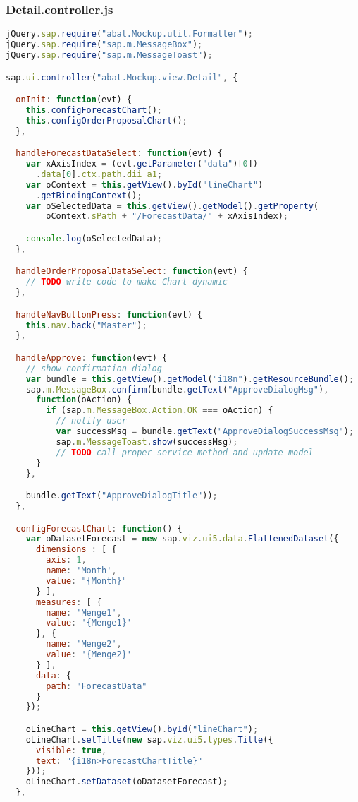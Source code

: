 \subsubsection*{Detail.controller.js}
\begin{lstlisting}[language=JavaScript, label=lst:Detail.controller.js]
jQuery.sap.require("abat.Mockup.util.Formatter");
jQuery.sap.require("sap.m.MessageBox");
jQuery.sap.require("sap.m.MessageToast");

sap.ui.controller("abat.Mockup.view.Detail", {

  onInit: function(evt) {
    this.configForecastChart();
    this.configOrderProposalChart();
  },

  handleForecastDataSelect: function(evt) {
    var xAxisIndex = (evt.getParameter("data")[0])
      .data[0].ctx.path.dii_a1;
    var oContext = this.getView().byId("lineChart")
      .getBindingContext();
    var oSelectedData = this.getView().getModel().getProperty(
        oContext.sPath + "/ForecastData/" + xAxisIndex);

    console.log(oSelectedData);
  },

  handleOrderProposalDataSelect: function(evt) {
    // TODO write code to make Chart dynamic
  },

  handleNavButtonPress: function(evt) {
    this.nav.back("Master");
  },

  handleApprove: function(evt) {
    // show confirmation dialog
    var bundle = this.getView().getModel("i18n").getResourceBundle();
    sap.m.MessageBox.confirm(bundle.getText("ApproveDialogMsg"),
      function(oAction) {
        if (sap.m.MessageBox.Action.OK === oAction) {
          // notify user
          var successMsg = bundle.getText("ApproveDialogSuccessMsg");
          sap.m.MessageToast.show(successMsg);
          // TODO call proper service method and update model
      }
    },

    bundle.getText("ApproveDialogTitle"));
  },

  configForecastChart: function() {
    var oDatasetForecast = new sap.viz.ui5.data.FlattenedDataset({
      dimensions : [ {
        axis: 1,
        name: 'Month',
        value: "{Month}"
      } ],
      measures: [ {
        name: 'Menge1',
        value: '{Menge1}'
      }, {
        name: 'Menge2',
        value: '{Menge2}'
      } ],
      data: {
        path: "ForecastData"
      }
    });

    oLineChart = this.getView().byId("lineChart");
    oLineChart.setTitle(new sap.viz.ui5.types.Title({
      visible: true,
      text: "{i18n>ForecastChartTitle}"
    }));
    oLineChart.setDataset(oDatasetForecast);
  },


\end{lstlisting}
